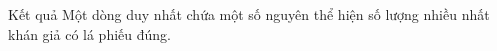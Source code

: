 Kết quả  
Một dòng duy nhất chứa một số nguyên thể hiện số lượng nhiều nhất khán giả có lá phiếu đúng.